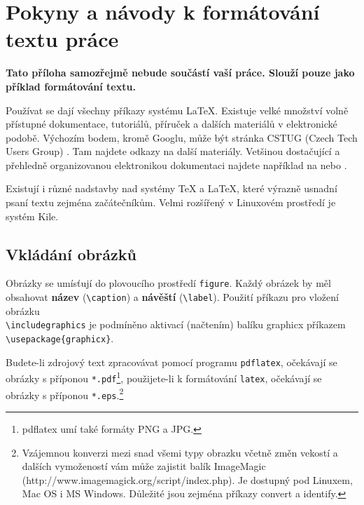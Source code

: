 \documentclass[11pt,twoside,a4paper]{book}
\begin{document}
%

\appendix



\chapter{Pokyny a návody k formátování textu práce}
\textbf{\large Tato příloha samozřejmě nebude součástí vaší práce. Slouží pouze jako příklad formátování textu.}

Používat se dají všechny příkazy systému \LaTeX. Existuje velké množství volně přístupné dokumentace,
tutoriálů, příruček a dalších materiálů v elektronické podobě. Výchozím bodem, kromě Googlu, může být stránka
CSTUG (Czech Tech Users Group) \cite{CSTUG}. Tam najdete odkazy na další materiály.  Vetšinou dostačující a
přehledně organizovanou elektronikou dokumentaci najdete například na \cite{latexdocweb} nebo \cite{latexwiki}.

Existují i různé nadstavby nad systémy \TeX{} a \LaTeX, které výrazně usnadní psaní textu zejména
začátečníkům. Velmi rozšířený v Linuxovém prostředí je systém Kile.


\section{Vkládání obrázků}
Obrázky se umísťují do plovoucího prostředí \verb|figure|. Každý obrázek by měl obsahovat \textbf{název}
(\verb|\caption|) a \textbf{návěští} (\verb|\label|). Použití příkazu pro vložení obrázku
\\\verb|\includegraphics| je podmíněno aktivací (načtením) balíku graphicx příkazem\\
\verb|\usepackage{graphicx}|.

Budete-li zdrojový text zpracovávat pomocí programu \verb|pdflatex|, očekávají se obrázky s příponou
\verb|*.pdf|\footnote{pdflatex umí také formáty PNG a JPG.}, použijete-li k formátování \verb|latex|,
očekávají se obrázky s příponou \verb|*.eps|.\footnote{Vzájemnou konverzi mezi snad všemi typy obrazku včetně
změn vekostí a dalších vymožeností vám může zajistit balík ImageMagic 
(http://www.imagemagick.org/script/index.php). Je dostupný pod Linuxem, Mac OS i MS Windows. Důležité jsou
zejména příkazy convert a identify.}
\end{document}
